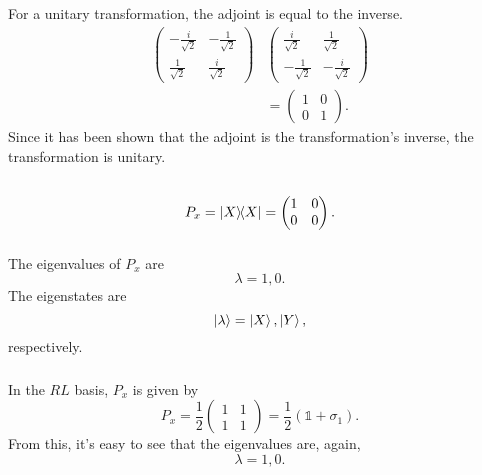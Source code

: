 \documentclass[a4paper,12pt,twoside]{article}
\begin{document}
\begin{multicols*}{2}
\subsubsection{}
For a unitary transformation, the adjoint is equal to the inverse.
\begin{align}
	\begin{pmatrix}
		-\frac{i}{\sqrt{2}} & -\frac{1}{\sqrt{2}} \\
		\frac{1}{\sqrt{2}} & \frac{i}{\sqrt{2}}
	\end{pmatrix}&
	\begin{pmatrix}
		\frac{i}{\sqrt{2}} & \frac{1}{\sqrt{2}} \\
		-\frac{1}{\sqrt{2}} & -\frac{i}{\sqrt{2}}
	\end{pmatrix}\nonumber\\
	&= \begin{pmatrix}
		1 & 0 \\
		0 & 1
	\end{pmatrix}.
\end{align}
Since it has been shown that the adjoint is the transformation's inverse, the transformation is unitary.
\subsection{}%
\subsubsection{}
\begin{equation}
	P_x = \op{X} = \begin{pmatrix}
		1 & 0 \\
		0 & 0
	\end{pmatrix}.
\end{equation}
\subsubsection{}
The eigenvalues of $P_x$ are
\begin{equation}
	\lambda = 1,0.
\end{equation}
The eigenstates are
\begin{equation}
	\ket{\lambda} = \ket{X},\ket{Y},
\end{equation}
respectively.
\subsubsection{}
In the $RL$ basis, $P_x$ is given by
\begin{equation}
	P_x = \frac{1}{2} \begin{pmatrix}
		1 & 1 \\ 1 & 1
	\end{pmatrix} = \frac{1}{2}(\mathbb{1}+\sigma_1).
\end{equation}
From this, it's easy to see that the eigenvalues are, again,
\begin{equation}
	\lambda = 1,0.
\end{equation}


\end{multicols*}
\end{document}
